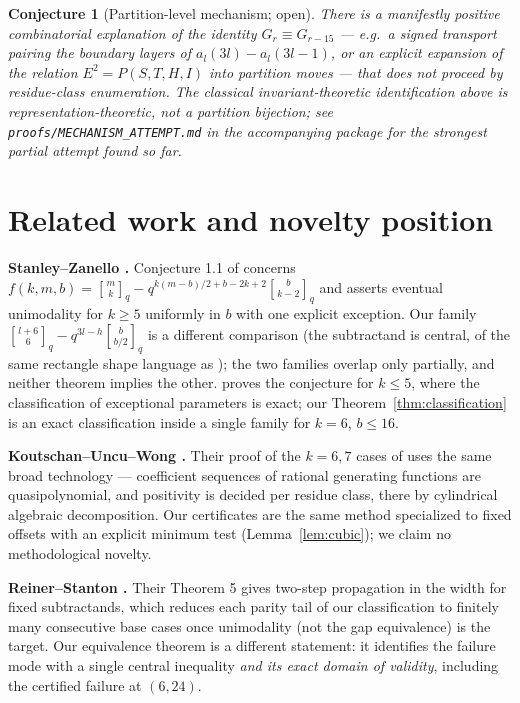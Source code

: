 \documentclass[11pt,reqno]{article}
\newtheorem{conjecture}[theorem]{Conjecture}
\theoremstyle{definition}
\newcommand{\ggbrack}[2]{\genfrac{[}{]}{0pt}{}{#1}{#2}_q}
\begin{document}
\begin{conjecture}[Partition-level mechanism; open]\label{conj:mechanism}
There is a \emph{manifestly positive combinatorial} explanation of the identity $G_r\equiv G_{r-15}$ --- e.g.\ a signed transport pairing the boundary layers of $a_l(3l)-a_l(3l-1)$, or an explicit expansion of the relation $E^2=P(S,T,H,I)$ into partition moves --- that does not proceed by residue-class enumeration. The classical invariant-theoretic identification above is representation-theoretic, not a partition bijection; see \texttt{proofs/MECHANISM\_ATTEMPT.md} in the accompanying package for the strongest partial attempt found so far.
\end{conjecture}

\section{Related work and novelty position}\label{sec:related}
\textbf{Stanley--Zanello \cite{SZ}.} Conjecture 1.1 of \cite{SZ} concerns $f(k,m,b)=\ggbrack{m}{k}-q^{k(m-b)/2+b-2k+2}\ggbrack{b}{k-2}$ and asserts eventual unimodality for $k\ge5$ uniformly in $b$ with one explicit exception. Our family $\ggbrack{l+6}{6}-q^{3l-h}\ggbrack{b}{b/2}$ is a different comparison (the subtractand is central, of the same rectangle shape language as \cite{CJ}); the two families overlap only partially, and neither theorem implies the other. \cite{SZ} proves the conjecture for $k\le5$, where the classification of exceptional parameters is exact; our Theorem~\ref{thm:classification} is an exact classification inside a single family for $k=6$, $b\le16$.

\textbf{Koutschan--Uncu--Wong \cite{KUW}.} Their proof of the $k=6,7$ cases of \cite{SZ} uses the same broad technology --- coefficient sequences of rational generating functions are quasipolynomial, and positivity is decided per residue class, there by cylindrical algebraic decomposition. Our certificates are the same method specialized to fixed offsets with an explicit minimum test (Lemma~\ref{lem:cubic}); we claim no methodological novelty.

\textbf{Reiner--Stanton \cite{RS}.} Their Theorem 5 gives two-step propagation in the width for fixed subtractands, which reduces each parity tail of our classification to finitely many consecutive base cases once unimodality (not the gap equivalence) is the target. Our equivalence theorem is a different statement: it identifies the failure mode with a single central inequality \emph{and its exact domain of validity}, including the certified failure at $(6,24)$.
\end{document}
